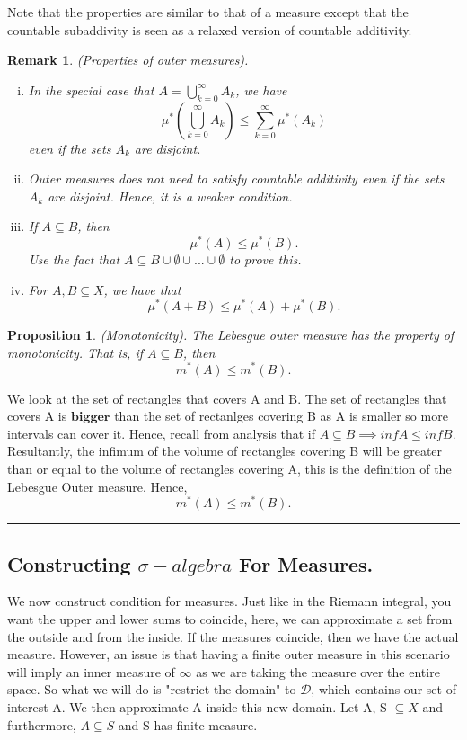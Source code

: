 \documentclass[twoside]{article}
\newtheorem{proposition}[theorem]{Proposition}
\newtheorem{remark}[theorem]{Remark}
\newenvironment{proof}{{\bf Proof:}}{\hfill\rule{2mm}{2mm}}
\newcommand{\sa}{\sigma-algebra}
\begin{document}
Note that the properties are similar to that of a measure except that the countable subaddivity is seen as a relaxed version of countable additivity.

\begin{remark}
(Properties of outer measures).
\begin{enumerate}[(i)]
    \item In the special case that $A = \bigcup_{k=0}^{\infty}A_k$, we have $$\mu^*(\bigcup_{k=0}^{\infty}A_k) \leq \sum_{k=0}^{\infty}\mu^*(A_k)$$ even if the sets $A_k$ are disjoint.
    \item Outer measures does not need to satisfy countable additivity even if the sets $A_k$ are disjoint. Hence, it is a weaker condition.
    \item If $A \subseteq B$, then $$\mu^*(A) \leq \mu^*(B).$$ Use the fact that $A \subseteq B \cup \emptyset \cup ... \cup \emptyset$ to prove this.
    \item For $A, B \subseteq X$, we have that $$\mu^*(A+B) \leq \mu^*(A) + \mu^*(B).$$
\end{enumerate}
\end{remark}


\begin{proposition}
(Monotonicity). The Lebesgue outer measure has the property of monotonicity. That is, if $A \subseteq B$, then 
$$
m^*(A) \leq m^*(B). 
$$
\end{proposition}
\begin{proof}
We look at the set of rectangles that covers A and B. The set of rectangles that covers A is $\textbf{bigger}$ than the set of rectanlges covering B as A is smaller so more intervals can cover it. Hence, recall from analysis that if $A \subseteq B \implies inf A \leq inf B$. Resultantly, the infimum of the volume of rectangles covering B will be greater than or equal to the volume of rectangles covering A, this is the definition of the Lebesgue Outer measure. Hence,
$$
m^*(A) \leq m^*(B).
$$
\end{proof}

\subsection{Constructing $\sa$ For Measures.}

We now construct condition for measures. Just like in the Riemann integral, you want the upper and lower sums to coincide, here, we can approximate a set from the outside and from the inside. If the measures coincide, then we have the actual measure. However, an issue is that having a finite outer measure in this scenario will imply an inner measure of $\infty$ as we are taking the measure over the entire space. So what we will do is "restrict the domain" to $\mathcal{D}$, which contains our set of interest A. We then approximate A inside this new domain. Let A, S $\subseteq X$ and furthermore, $A \subseteq S$ and S has finite measure.
\end{document}
